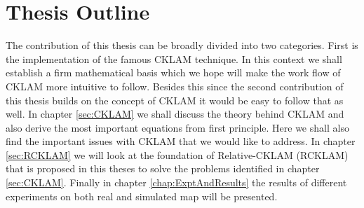 \section{Thesis Outline}
The contribution of this thesis can be broadly divided into two categories. First is the implementation of the famous CKLAM technique. In this context we shall establish a firm mathematical basis which we hope will make the work flow of CKLAM more intuitive to follow. Besides this since the second contribution of this thesis builds on the concept of CKLAM it would be easy to follow that as well. In chapter \ref {sec:CKLAM} we shall discuss the theory behind CKLAM and also derive the most important equations from first principle. Here we shall also find the important issues with CKLAM that we would like to address. In chapter \ref{sec:RCKLAM} we will look at the foundation of Relative-CKLAM (RCKLAM) that is proposed in this theses to solve the problems identified in chapter \ref{sec:CKLAM}. Finally in chapter \ref{chap:ExptAndResults} the results of different experiments on both real and simulated map will be presented.
